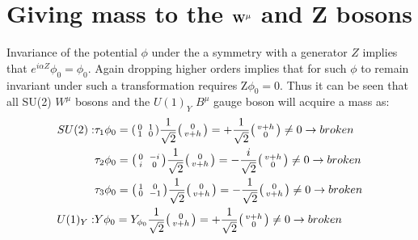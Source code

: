 \section{Giving mass to the $\bf{W^{\mu}}$ and Z bosons}
Invariance of the potential $\phi$ under the a symmetry with a generator $Z$ implies that $e^{i\alpha Z}\phi_{0} = \phi_{0}$.  Again dropping higher orders implies that for such $\phi$ to remain invariant under such a transformation requires Z$\phi_{0} = 0$. Thus it can be seen that all SU(2) $W^{\mu}$  bosons and the $U(1)_{Y}$ $B^{\mu}$ gauge boson will acquire a mass as:
\begin{equation}
  \begin{split}
    SU(2):
    &\tau_{1}\phi_{0} =\begin{psmallmatrix}0&&1\\1&&0\end{psmallmatrix}\frac{1}{\sqrt{2}} \begin{psmallmatrix}0\\v+h\end{psmallmatrix}= +\frac{1}{\sqrt{2}}\begin{psmallmatrix}v+h\\0\end{psmallmatrix}\neq 0 \to broken\\
    &\tau_{2}\phi_{0} =\begin{psmallmatrix}0&&-i\\i&&0\end{psmallmatrix}\frac{1}{\sqrt{2}}\begin{psmallmatrix}0\\v+h\end{psmallmatrix}= -\frac{i}{\sqrt{2}}\begin{psmallmatrix}v+h\\0\end{psmallmatrix}\neq 0 \to broken\\
    &\tau_{3}\phi_{0} =\begin{psmallmatrix}1&&0\\0&&-1\end{psmallmatrix}\frac{1}{\sqrt{2}}\begin{psmallmatrix}0\\v+h\end{psmallmatrix}= -\frac{1}{\sqrt{2}}\begin{psmallmatrix}0\\v+h\end{psmallmatrix}\neq 0 \to broken\\
    U(1)_{Y}:
    &Y\phi_{0} =         Y_{\phi_{0}}\frac{1}{\sqrt{2}} \begin{psmallmatrix}0\\v+h\end{psmallmatrix}= +\frac{1}{\sqrt{2}}\begin{psmallmatrix}v+h\\0\end{psmallmatrix}\neq 0 \to broken\\
  \end{split}
\end{equation}
